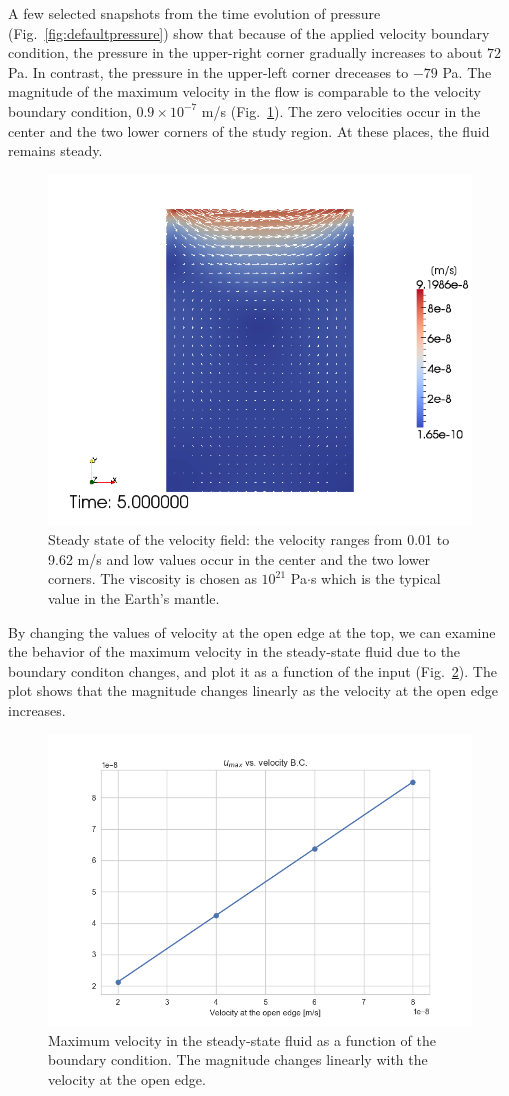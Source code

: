 \documentclass[12pt]{article}
\numberwithin{figure}{section}  %
\numberwithin{equation}{section}  %
\begin{document}
\begin{multicols}{2}
A few selected snapshots from the time evolution of pressure (Fig.\ \ref{fig:defaultpressure}) show that because of the applied velocity boundary condition, the pressure in the upper-right corner gradually increases to about $72$ Pa. In contrast, the pressure in the upper-left corner dreceases to $-79$ Pa. The magnitude of the maximum velocity in the flow is comparable to the velocity boundary condition, $0.9\times10^{-7}$ m/s (Fig.\ \ref{fig:defaultvelocity}). The zero velocities occur in the center and the two lower corners of the study region. At these places, the fluid remains steady.

\begin{figure}[H]
	\centering
	\includegraphics[width=0.7\linewidth]{../Python/report/ns_routine/default_u_final}
	\caption{Steady state of the velocity field: the velocity ranges from 0.01 to 9.62 m/s and low values occur in the center and the two lower corners. The viscosity is chosen as $10^{21}$ Pa$\cdot$s which is the typical value in the Earth's mantle.}
	\label{fig:defaultvelocity}
\end{figure}

By changing the values of velocity at the open edge at the top, we can examine the behavior of the maximum velocity in the steady-state fluid due to the boundary conditon changes, and plot it as a function of the input (Fig.\ \ref{fig:velocity}). The plot shows that the magnitude changes linearly as the velocity at the open edge increases.

\begin{figure}[H]
	\centering
	\includegraphics[width=0.7\linewidth]{../Python/output/ns_solution/log/velocity}
	\caption{Maximum velocity in the steady-state fluid as a function of the boundary condition. The magnitude changes linearly with the velocity at the open edge.}
	\label{fig:velocity}
\end{figure}


\end{multicols}
\end{document}
